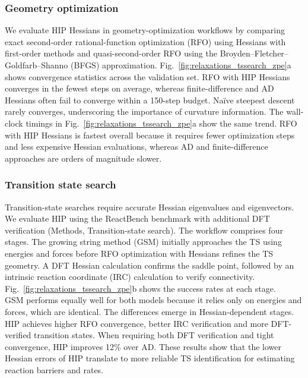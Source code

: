 \documentclass[pdflatex,sn-mathphys-num]{sn-jnl}%
\begin{document}
\subsubsection{Geometry optimization}

We evaluate HIP Hessians in geometry-optimization workflows by comparing exact second-order rational-function optimization (RFO) using Hessians with first-order methods and quasi-second-order RFO using the Broyden--Fletcher--Goldfarb--Shanno (BFGS) approximation.
Fig.~\ref{fig:relaxations_tssearch_zpe}a shows convergence statistics across the validation set. RFO with HIP Hessians converges in the fewest steps on average, whereas finite-difference and AD Hessians often fail to converge within a 150-step budget. Na\"ive steepest descent rarely converges, underscoring the importance of curvature information.
The wall-clock timings in Fig.~\ref{fig:relaxations_tssearch_zpe}a show the same trend. RFO with HIP Hessians is fastest overall because it requires fewer optimization steps and less expensive Hessian evaluations, whereas AD and finite-difference approaches are orders of magnitude slower.

\subsubsection{Transition state search}
Transition-state searches require accurate Hessian eigenvalues and eigenvectors. We evaluate HIP using the ReactBench benchmark \cite{zhao2025} with additional DFT verification (Methods, Transition-state search). The workflow comprises four stages. The growing string method (GSM) initially approaches the TS using energies and forces before RFO optimization with Hessians refines the TS geometry. A DFT Hessian calculation confirms the saddle point, followed by an intrinsic reaction coordinate (IRC) calculation to verify connectivity.
Fig.~\ref{fig:relaxations_tssearch_zpe}b shows the success rates at each stage.\\
GSM performs equally well for both models because it relies only on energies and forces, which are identical. The differences emerge in Hessian-dependent stages. HIP achieves higher RFO convergence, better IRC verification and more DFT-verified transition states. When requiring both DFT verification and tight convergence, HIP improves 12\% over AD.
These results show that the lower Hessian errors of HIP translate to more reliable TS identification for estimating reaction barriers and rates.
\end{document}
